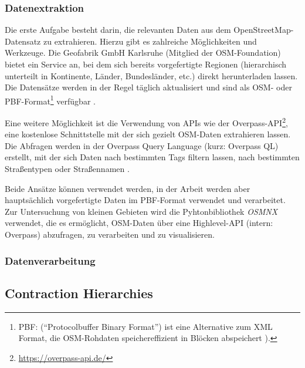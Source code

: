 \subsubsection{Datenextraktion}
Die erste Aufgabe besteht darin, die relevanten Daten aus dem OpenStreetMap-Datensatz zu
extrahieren. Hierzu gibt es zahlreiche Möglichkeiten und Werkzeuge. Die Geofabrik GmbH Karlsruhe
(Mitglied der \ac{OSM}-Foundation) bietet \ua ein Service an, bei dem sich bereits vorgefertigte
Regionen (hierarchisch unterteilt in Kontinente, Länder, Bundesländer, etc.) direkt herunterladen
lassen. Die Datensätze werden in der Regel täglich aktualisiert und sind als OSM- oder
PBF-Format\footnote{PBF: ("`Protocolbuffer Binary Format"') ist eine Alternative zum XML Format, die
    OSM-Rohdaten speichereffizient in Blöcken abspeichert \cite{osm.pbf}).} verfügbar
\cite{osm.geofabrik}.

Eine weitere Möglichkeit ist die Verwendung von \acp{API} wie \zB der
Overpass-\ac{API}\footnote{\url{https://overpass-api.de/}}, eine kostenlose Schnittstelle mit der
sich gezielt \ac{OSM}-Daten extrahieren lassen. Die Abfragen werden in der Overpass Query Language
(kurz: Overpass QL) erstellt, mit der sich Daten \ua nach bestimmten Tags filtern lassen, \zB nach
bestimmten Straßentypen oder Straßennamen \cite{osm.overpass}.

Beide Ansätze können verwendet werden, in der Arbeit werden aber hauptsächlich vorgefertigte Daten
im PBF-Format verwendet und verarbeitet. Zur Untersuchung von kleinen Gebieten wird die
Pyhtonbibliothek \emph{OSMNX} verwendet, die es ermöglicht, \ac{OSM}-Daten über eine
Highlevel-\ac{API} (intern: Overpass) abzufragen, zu verarbeiten und zu visualisieren.

\subsubsection{Datenverarbeitung}

\subsection{Contraction Hierarchies}
